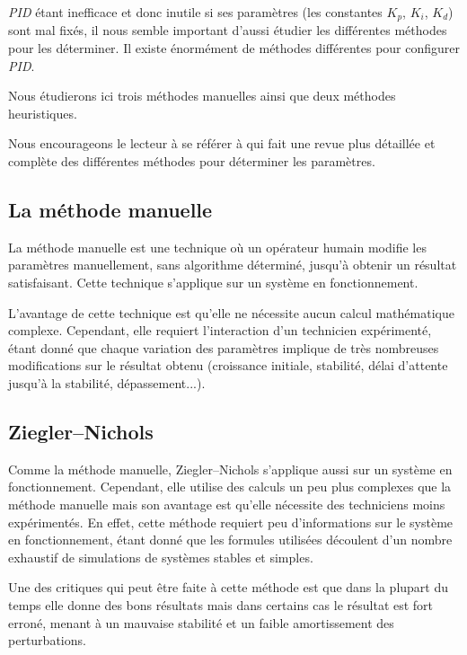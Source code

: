 \documentclass[a4paper,10pt]{report}
\begin{document}
\emph{PID} étant inefficace et donc inutile si ses paramètres (les constantes $K_p$, $K_i$, $K_d$) sont mal fixés, il nous semble important d'aussi étudier les différentes méthodes pour les déterminer. Il existe énormément de méthodes différentes pour configurer \emph{PID}.

Nous étudierons ici trois méthodes manuelles ainsi que deux méthodes heuristiques.

Nous encourageons le lecteur à se référer à \cite{shahrokhi2013comparison} qui fait une revue plus détaillée et complète des différentes méthodes pour déterminer les paramètres.


\subsection{La méthode manuelle}

La méthode manuelle est une technique où un opérateur humain modifie les paramètres manuellement, sans algorithme déterminé, jusqu'à obtenir un résultat satisfaisant. Cette technique s'applique sur un système en fonctionnement.

L'avantage de cette technique est qu'elle ne nécessite aucun calcul mathématique complexe. Cependant, elle requiert l'interaction d'un technicien expérimenté, étant donné que chaque variation des paramètres implique de très nombreuses modifications sur le résultat obtenu (croissance initiale, stabilité, délai d'attente jusqu'à la stabilité, dépassement...). \cite{zhong2006pid}


\subsection{Ziegler–Nichols}
Comme la méthode manuelle, Ziegler–Nichols s'applique aussi sur un système en fonctionnement. Cependant, elle utilise des calculs un peu plus complexes que la méthode manuelle mais son avantage est qu'elle nécessite des techniciens moins expérimentés.\cite{ziegler1942optimum}
En effet, cette méthode requiert peu d'informations sur le système en fonctionnement, étant donné que les formules utilisées découlent d'un nombre exhaustif de simulations de systèmes stables et simples. \cite{silva2007pid}

Une des critiques qui peut être faite à cette méthode est que dans la plupart du temps elle donne des bons résultats mais dans certains cas le résultat est fort erroné, menant à un mauvaise stabilité et un faible amortissement des perturbations. \cite{silva2007pid}
\end{document}
